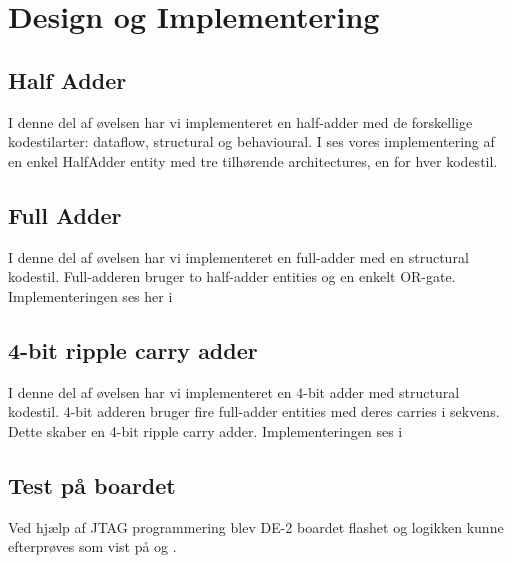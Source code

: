 \section{Design og Implementering}

\subsection{Half Adder}

I denne del af øvelsen har vi implementeret en half-adder med de forskellige
kodestilarter: dataflow, structural og behavioural. I  ses
vores implementering af en enkel HalfAdder entity med tre tilhørende
architectures, en for hver kodestil.


\subsection{Full Adder}

I denne del af øvelsen har vi implementeret en full-adder med en structural
kodestil. Full-adderen bruger to half-adder entities og en enkelt OR-gate.
Implementeringen ses her i 


\subsection{4-bit ripple carry adder}

I denne del af øvelsen  har vi implementeret en 4-bit adder med structural
kodestil. 4-bit adderen bruger fire full-adder entities med deres carries i
sekvens. Dette skaber en 4-bit ripple carry adder. Implementeringen ses i 


\subsection{Test på boardet}

Ved hjælp af JTAG programmering blev DE-2 boardet flashet og logikken kunne
efterprøves som vist på  og .
